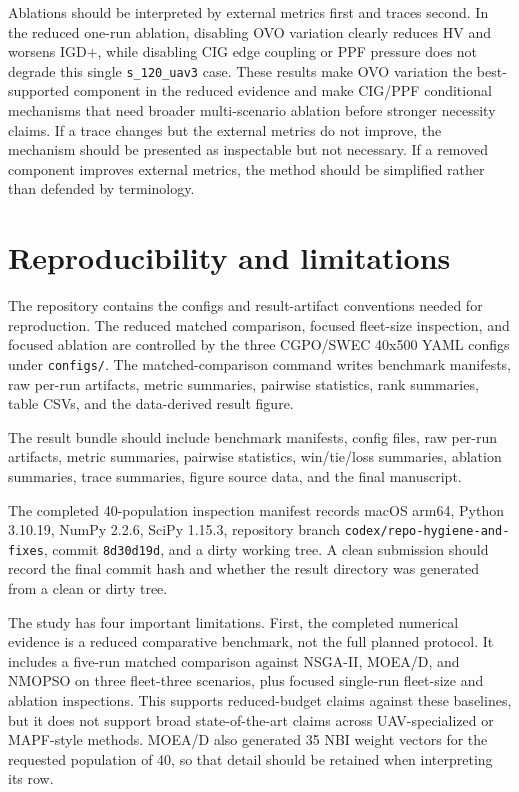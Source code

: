 \documentclass[a4paper,fleqn]{cas-dc}
\begin{document}
Ablations should be interpreted by external metrics first and traces second. In the reduced one-run ablation, disabling OVO variation clearly reduces HV and worsens IGD+, while disabling CIG edge coupling or PPF pressure does not degrade this single \texttt{s\_120\_uav3} case. These results make OVO variation the best-supported component in the reduced evidence and make CIG/PPF conditional mechanisms that need broader multi-scenario ablation before stronger necessity claims. If a trace changes but the external metrics do not improve, the mechanism should be presented as inspectable but not necessary. If a removed component improves external metrics, the method should be simplified rather than defended by terminology.

\clearpage
\section{Reproducibility and limitations}
\label{sec:reproducibility-limitations}

The repository contains the configs and result-artifact conventions needed for reproduction. The reduced matched comparison, focused fleet-size inspection, and focused ablation are controlled by the three CGPO/SWEC 40x500 YAML configs under \texttt{configs/}. The matched-comparison command writes benchmark manifests, raw per-run artifacts, metric summaries, pairwise statistics, rank summaries, table CSVs, and the data-derived result figure.

The result bundle should include benchmark manifests, config files, raw per-run artifacts, metric summaries, pairwise statistics, win/tie/loss summaries, ablation summaries, trace summaries, figure source data, and the final manuscript.

The completed 40-population inspection manifest records macOS arm64, Python 3.10.19, NumPy 2.2.6, SciPy 1.15.3, repository branch \texttt{codex/repo-hygiene-and-fixes}, commit \texttt{8d30d19d}, and a dirty working tree. A clean submission should record the final commit hash and whether the result directory was generated from a clean or dirty tree.

The study has four important limitations. First, the completed numerical evidence is a reduced comparative benchmark, not the full planned protocol. It includes a five-run matched comparison against NSGA-II, MOEA/D, and NMOPSO on three fleet-three scenarios, plus focused single-run fleet-size and ablation inspections. This supports reduced-budget claims against these baselines, but it does not support broad state-of-the-art claims across UAV-specialized or MAPF-style methods. MOEA/D also generated 35 NBI weight vectors for the requested population of 40, so that detail should be retained when interpreting its row.
\end{document}
